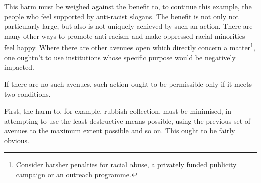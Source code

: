 \documentclass[10pt,a4paper]{article}
\begin{document}
\begin{multicols}{2}
	This harm must be weighed against the benefit to, to continue this
	example, the people who feel supported by anti-racist slogans. The
	benefit is not only not particularly large, but also is not uniquely
	achieved by such an action. There are many other ways to promote
	anti-racism and make oppressed racial minorities feel happy. Where there
	are other avenues open which directly concern a matter\footnote{Consider
		harsher penalties for racial abuse, a privately funded publicity
		campaign or an outreach programme.}, one oughtn't to use institutions
	whose specific purpose would be negatively impacted.
	
	If there are no such avenues, such action ought to be permissible only
	if it meets two conditions.
	
	First, the harm to, for example, rubbish collection, must be minimised,
	in attempting to use the least destructive means possible, using the
	previous set of avenues to the maximum extent possible and so on. This
	ought to be fairly obvious.
	

\end{multicols}
\end{document}
